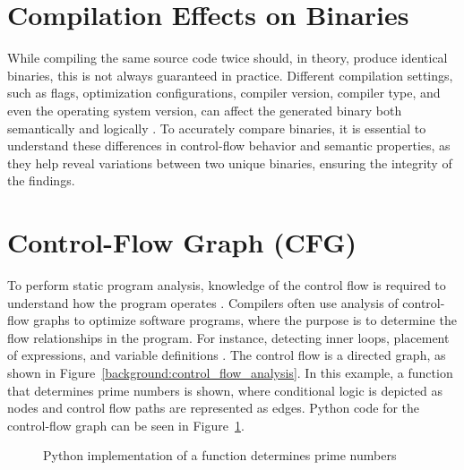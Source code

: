 \section{Compilation Effects on Binaries}
\label{sec:background:compilation_effects_on_binaries}

While compiling the same source code twice should, in theory, produce identical binaries, this is not always guaranteed in practice. Different compilation settings, such as flags, optimization configurations, compiler version, compiler type, and even the operating system version, can affect the generated binary both semantically and logically \cite{compiler_effects_on_binaries}. To accurately compare binaries, it is essential to understand these differences in control-flow behavior and semantic properties, as they help reveal variations between two unique binaries, ensuring the integrity of the findings.


\section{Control-Flow Graph (CFG)}
To perform static program analysis, knowledge of the control flow is required to understand how the program operates \cite{allen1970control}. Compilers often use analysis of control-flow graphs to optimize software programs, where the purpose is to determine the flow relationships in the program. For instance, detecting inner loops, placement of expressions, and variable definitions \cite{allen1970control}. The control flow is a directed graph, as shown in Figure~\ref{background:control_flow_analysis}. In this example, a function that determines prime numbers is shown, where conditional logic is depicted as nodes and control flow paths are represented as edges. Python code for the control-flow graph can be seen in Figure~\ref{fig:python_code-cfg}.



\begin{figure}[htbp]
    \centering
    
    \caption{Python implementation of a function determines prime numbers}
    \label{fig:python_code-cfg}
\end{figure}


